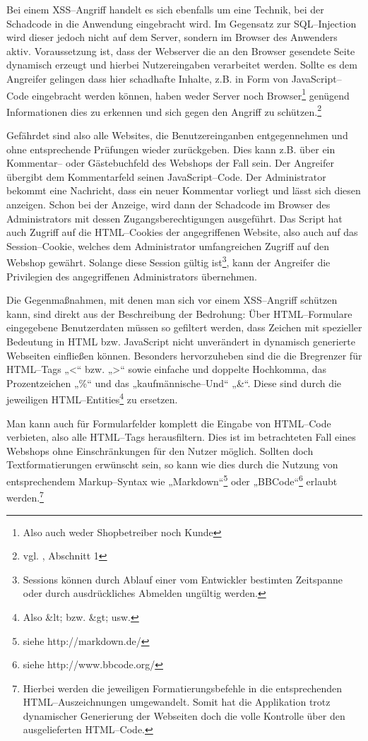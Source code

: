 Bei einem \ac{XSS}--Angriff handelt es sich ebenfalls um eine Technik, bei der Schadcode in die Anwendung eingebracht wird. Im Gegensatz zur SQL--Injection wird dieser jedoch nicht auf dem Server, sondern im Browser des Anwenders aktiv.
Voraussetzung ist, dass der Webserver die an den Browser gesendete Seite dynamisch erzeugt und hierbei Nutzereingaben verarbeitet werden. Sollte es dem Angreifer gelingen dass hier schadhafte Inhalte, z.B. in Form von JavaScript--Code eingebracht werden können, haben weder Server noch Browser\footnote{Also auch weder Shopbetreiber noch Kunde} genügend Informationen dies zu erkennen und sich gegen den Angriff zu schützen.\footnote{vgl. \cite{ross}, Abschnitt 1}

Gefährdet sind also alle Websites, die Benutzereinganben entgegennehmen und ohne entsprechende Prüfungen wieder zurückgeben. Dies kann z.B. über ein Kommentar-- oder Gästebuchfeld des Webshops der Fall sein. Der Angreifer übergibt dem Kommentarfeld seinen JavaScript--Code. Der Administrator bekommt eine Nachricht, dass ein neuer Kommentar vorliegt und lässt sich diesen anzeigen. Schon bei der Anzeige, wird dann der Schadcode im Browser des Administrators mit dessen Zugangsberechtigungen ausgeführt. Das Script hat auch Zugriff auf die HTML--Cookies der angegriffenen Website, also auch auf das Session--Cookie, welches dem Administrator umfangreichen Zugriff auf den Webshop gewährt. Solange diese Session gültig ist\footnote{Sessions können durch Ablauf einer vom Entwickler bestimten Zeitspanne oder durch ausdrückliches Abmelden ungültig werden.}, kann der Angreifer die Privilegien des angegriffenen Administrators übernehmen.

Die Gegenmaßnahmen, mit denen man sich vor einem \ac{XSS}--Angriff schützen kann, sind direkt aus der Beschreibung der Bedrohung: Über HTML--Formulare eingegebene Benutzerdaten müssen so gefiltert werden, dass Zeichen mit spezieller Bedeutung in \ac{HTML} bzw. JavaScript nicht unverändert in dynamisch generierte Webseiten einfließen können. Besonders hervorzuheben sind die die Bregrenzer für HTML--Tags „<“ bzw. „>“ sowie einfache und doppelte Hochkomma, das Prozentzeichen „\%“ und das „kaufmännische--Und“ „\&“. Diese sind durch die jeweiligen HTML--Entities\footnote{Also \&lt; bzw. \&gt; usw.} zu ersetzen.

Man kann auch für Formularfelder komplett die Eingabe von HTML--Code verbieten, also alle HTML--Tags herausfiltern. Dies ist im betrachteten Fall eines Webshops ohne Einschränkungen für den Nutzer möglich. Sollten doch Textformatierungen erwünscht sein, so kann wie dies durch die Nutzung von entsprechendem Markup--Syntax wie „Markdown“\footnote{siehe http://markdown.de/} oder „BBCode“\footnote{siehe http://www.bbcode.org/} erlaubt werden.\footnote{Hierbei werden die jeweiligen Formatierungsbefehle in die entsprechenden HTML--Auszeichnungen umgewandelt. Somit hat die Applikation trotz dynamischer Generierung der Webseiten doch die volle Kontrolle über den ausgelieferten HTML--Code.}

